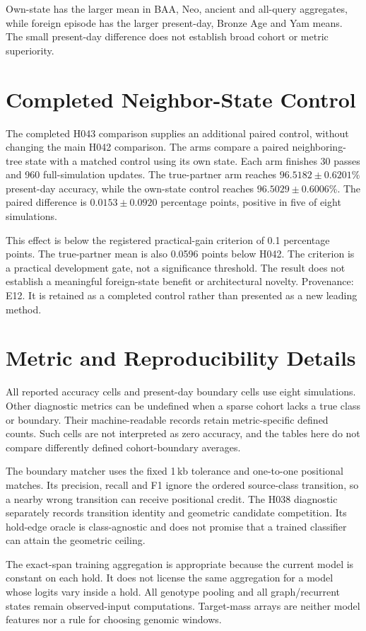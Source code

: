 \documentclass[letterpaper]{article}
\begin{document}
Own-state has the larger mean in BAA, Neo, ancient and all-query aggregates, while foreign episode has the larger present-day, Bronze Age and Yam means. The small present-day difference does not establish broad cohort or metric superiority.

\section{Completed Neighbor-State Control}
The completed H043 comparison supplies an additional paired control, without changing the main H042 comparison. The arms compare a paired neighboring-tree state with a matched control using its own state. Each arm finishes 30 passes and 960 full-simulation updates. The true-partner arm reaches $96.5182\pm0.6201\%$ present-day accuracy, while the own-state control reaches $96.5029\pm0.6006\%$. The paired difference is $0.0153\pm0.0920$ percentage points, positive in five of eight simulations.

This effect is below the registered practical-gain criterion of 0.1 percentage points. The true-partner mean is also 0.0596 points below H042. The criterion is a practical development gate, not a significance threshold. The result does not establish a meaningful foreign-state benefit or architectural novelty. Provenance: E12. It is retained as a completed control rather than presented as a new leading method.

\section{Metric and Reproducibility Details}
All reported accuracy cells and present-day boundary cells use eight simulations. Other diagnostic metrics can be undefined when a sparse cohort lacks a true class or boundary. Their machine-readable records retain metric-specific defined counts. Such cells are not interpreted as zero accuracy, and the tables here do not compare differently defined cohort-boundary averages.

The boundary matcher uses the fixed 1\,kb tolerance and one-to-one positional matches. Its precision, recall and F1 ignore the ordered source-class transition, so a nearby wrong transition can receive positional credit. The H038 diagnostic separately records transition identity and geometric candidate competition. Its hold-edge oracle is class-agnostic and does not promise that a trained classifier can attain the geometric ceiling.

The exact-span training aggregation is appropriate because the current model is constant on each hold. It does not license the same aggregation for a model whose logits vary inside a hold. All genotype pooling and all graph/recurrent states remain observed-input computations. Target-mass arrays are neither model features nor a rule for choosing genomic windows.
\end{document}
